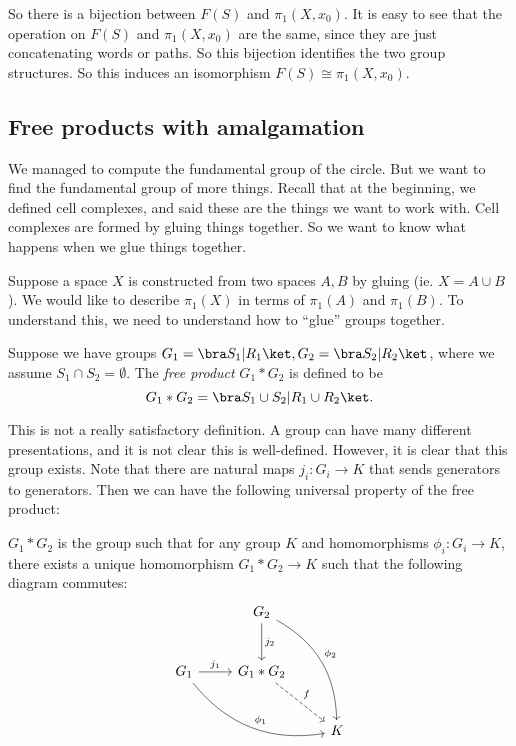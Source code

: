 \documentclass[a4paper]{article}
\begin{document}
So there is a bijection between $F(S)$ and $\pi_1(X, x_0)$. It is easy to see that the operation on $F(S)$ and $\pi_1(X, x_0)$ are the same, since they are just concatenating words or paths. So this bijection identifies the two group structures. So this induces an isomorphism $F(S)\cong \pi_1(X, x_0)$.

\subsection{Free products with amalgamation}
We managed to compute the fundamental group of the circle. But we want to find the fundamental group of more things. Recall that at the beginning, we defined cell complexes, and said these are the things we want to work with. Cell complexes are formed by gluing things together. So we want to know what happens when we glue things together.

Suppose a space $X$ is constructed from two spaces $A, B$ by gluing (ie. $X = A\cup B$). We would like to describe $\pi_1(X)$ in terms of $\pi_1(A)$ and $\pi_1(B)$. To understand this, we need to understand how to ``glue'' groups together.

\begin{defi}
  Suppose we have groups $G_1 = \bra S_1 | R_1\ket, G_2 = \bra S_2 | R_2\ket$, where we assume $S_1 \cap S_2 = \emptyset$. The \emph{free product} $G_1 * G_2$ is defined to be
  \[
    G_1 * G_2 = \bra S_1 \cup S_2 | R_1 \cup R_2\ket.
  \]
\end{defi}
This is not a really satisfactory definition. A group can have many different presentations, and it is not clear this is well-defined. However, it is clear that this group exists. Note that there are natural maps $j_i: G_i \to K$ that sends generators to generators. Then we can have the following universal property of the free product:

\begin{lemma}
  $G_1 * G_2$ is the group such that for any group $K$ and homomorphisms $\phi_i: G_i \to K$, there exists a unique homomorphism $G_1 * G_2 \to K$ such that the following diagram commutes:
  \[
    \begin{tikzcd}[row sep=large]
      & G_2 \ar[rdd, bend left, "\phi_2"] \ar[d, "j_2"]\\
      G_1 \ar[rrd, bend right, "\phi_1"] \ar [r, "j_1"] & G_1 * G_2 \ar [rd, dashed, "f"]\\
      && K
    \end{tikzcd}
  \]
\end{lemma}
\end{document}
